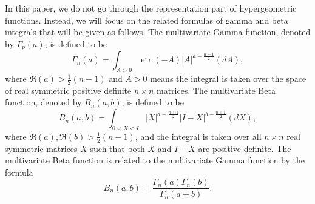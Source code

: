 \documentclass{amsart}
\theoremstyle{definition}
\numberwithin{equation}{section}
\begin{document}
In this paper, we do not go through the representation part of hypergeometric functions. Instead, we will focus on the related formulas of gamma and beta integrals that will be given as follows. The multivariate Gamma function, denoted by $\varGamma_{p}(a)$, is defined to be
\begin{equation}
    \varGamma_{n}(a) = \int_{A>0} \operatorname{etr} (-A) |A|^{a-\frac{n+1}{2}} (dA),
\end{equation}
where $\Re (a) > \frac{1}{2}(n-1)$ and $A>0$ means the integral is taken over the space of real symmetric positive definite $n \times n$ matrices. The multivariate Beta function, denoted by $B_{n}(a,b)$, is defined to be
\begin{equation}
    B_{n}(a,b) =\int_{0< X < I} |X|^{a - \frac{n+1}{2}} |I-X|^{b - \frac{n+1}{2}} (dX),
\end{equation}
where $\Re (a), \Re (b) > \frac{1}{2}(n-1)$, and the integral is taken over all $n\times n$ real symmetric matrices $X$ such that both $X$ and $I - X$ are positive definite. The multivariate Beta function is related to the multivariate Gamma function by the formula 
\begin{equation}
    B_{n}(a,b) = \frac{\varGamma_{n}(a)\varGamma_{n}(b)}{\varGamma_{n}(a + b)}.
\end{equation}
\end{document}
